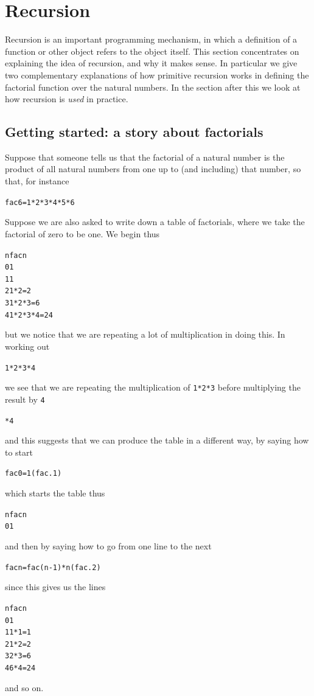 
\section{Recursion}
\label{recursionIntro}

Recursion is an important programming mechanism, in which a definition of
a function or other object refers to the object itself. This section
concentrates on explaining the idea of recursion, and why it makes
sense.
In particular we give two complementary explanations
of how primitive recursion works in defining the factorial function over the
natural numbers. In the section after this we look at how recursion is
{\em used\/} in practice.

\subsection*{Getting started: a story about factorials}

Suppose that someone tells us that the factorial of a natural number is
the product of all natural numbers from one up to (and including) that number, so
that, for instance
\begin{alltt}
fac 6 = 1*2*3*4*5*6
\end{alltt}
Suppose we are also asked to write down a table of factorials, 
where we take the factorial of zero to be
one. We begin thus
\begin{alltt}
  n      fac n
  0        1
  1        1 
  2        1*2 = 2
  3        1*2*3 = 6
  4        1*2*3*4 = 24
\end{alltt}
but we notice that we are repeating a lot of multiplication in doing
this. In working out
\begin{alltt}
1*2*3*4
\end{alltt} we see that we are repeating the
multiplication of \texttt{1*2*3} before multiplying the result by
\texttt{4}
\begin{alltt}
\hspace{3pt}*4
\end{alltt}
and this suggests that we can produce the table in a different way, by
saying how to start
\begin{alltt}
fac 0 = 1\hfill(fac.1)
\end{alltt}
which starts the table thus
\begin{alltt}
  n      fac n
  0        1
\end{alltt}
and then by saying how to go from one line to the next
\begin{alltt}
fac n = fac (n-1) * n\hfill(fac.2)
\end{alltt}
since this gives us the lines
\begin{alltt}
  n      fac n
  0        1
  1        1*1 = 1
  2        1*2 = 2
  3        2*3 = 6
  4        6*4 = 24
\end{alltt}
and so on.

